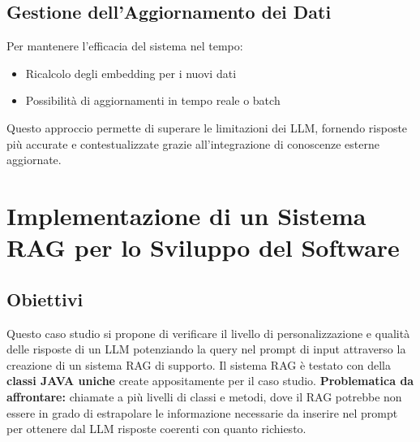 \documentclass[12pt,a4paper,openright,twoside]{book}
\begin{document}
\section{Gestione dell'Aggiornamento dei Dati}
Per mantenere l'efficacia del sistema nel tempo:
\begin{itemize}
    \item Ricalcolo degli embedding per i nuovi dati
    \item Possibilità di aggiornamenti in tempo reale o batch
\end{itemize}

Questo approccio permette di superare le limitazioni dei LLM, fornendo risposte più accurate e contestualizzate grazie all'integrazione di conoscenze esterne aggiornate.

\chapter{Implementazione di un Sistema RAG per lo Sviluppo del Software}

\section{Obiettivi}

Questo caso studio si propone di verificare il livello di personalizzazione e qualità delle risposte di un LLM potenziando la query nel prompt di input 
attraverso la creazione di un sistema RAG di supporto.
Il sistema RAG è testato con della \textbf{classi JAVA uniche} create appositamente per il caso studio.
\newline\textbf{Problematica da affrontare:} chiamate a più livelli di classi e metodi, dove il RAG potrebbe non essere in grado di estrapolare
le informazione necessarie da inserire nel prompt per ottenere dal LLM risposte coerenti con quanto richiesto.
\end{document}
